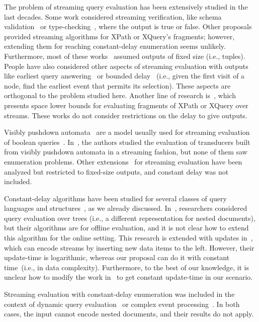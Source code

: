 The problem of streaming query evaluation has been extensively studied in the last decades. Some work considered streaming verification, like schema validation~\cite{SegoufinV02} or type-checking~\cite{KumarMV07}, where the output is true or false. Other proposals~\cite{ChenDZ06,OlteanuFB04,JosifovskiFB05,GreenGMOS04,Olteanu07} provided streaming algorithms for XPath or XQuery's fragments; however, extending them for reaching constant-delay enumeration seems unlikely. Furthermore, most of these works~\cite{KumarMV07,GouC07,GauwinNT09} assumed outputs of fixed size (i.e., tuples). People have also considered other aspects of streaming evaluation with outputs like earliest query answering~\cite{GauwinNT09} or bounded delay~\cite{DBLP:conf/lata/GauwinNT09} (i.e., given the first visit of a node, find the earliest event that permits its selection). These aspects are orthogonal to the problem studied here.
Another line of research is~\cite{BarYossefFJ05,BarYossefFJ07}, which presents space lower bounds for evaluating fragments of XPath or XQuery over streams. These works do not consider restrictions on the delay to give outputs.  

Visibly pushdown automata~\cite{AlurM04} {are} a model usually used for streaming evaluation of boolean queries~\cite{KumarMV07}. 
In~\cite{FiliotGRS19,AlurFMRS20}, the authors studied the evaluation of transducers built from visibly pushdown automata in a streaming fashion, but none of them {saw} enumeration problems. 
Other extensions~\cite{GauwinNR08} for streaming evaluation have been analyzed but restricted to fixed-size outputs, and constant delay was not included. 

Constant-delay algorithms have been studied for several classes of query languages and structures~\cite{Segoufin13}, as we already discussed. In~\cite{Bagan06,AmarilliBJM17}, researchers considered query evaluation over trees (i.e., a different representation {for} nested documents), but their algorithms are for offline evaluation, and {it is not clear how to extend this algorithm for the online setting}. 
This research is extended with updates in~\cite{AmarilliBMN19pods}, which can encode streams by inserting new data items to the left. However, their update-time is logarithmic, whereas our proposal can do it with constant time~(i.e., in data complexity).
Furthermore, to the best of our knowledge, it is unclear how to modify the work in~\cite{AmarilliBMN19pods} to get constant update-time in our scenario.

Streaming evaluation with constant-delay enumeration was included in the context of dynamic query evaluation~{\cite{IdrisUV17,BerkholzKS17,NikolicO18,0002NOZ20}} or complex event processing~\cite{GrezRU19,GrezR20}. In both cases, the input cannot encode nested documents, and their results do not apply.